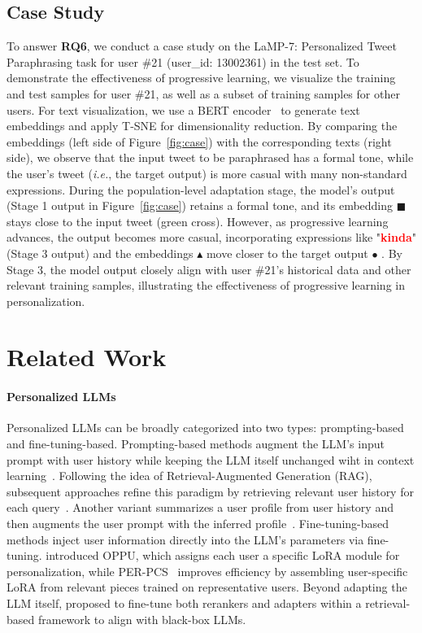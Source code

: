 \documentclass[11pt]{article}
\begin{document}
\subsection{Case Study}

To answer \textbf{RQ6}, we conduct a case study on the LaMP-7: Personalized Tweet Paraphrasing task for user \#21 (user\_id: 13002361) in the test set. 
To demonstrate the effectiveness of progressive learning, we visualize the training and test samples for user \#21, as well as a subset of training samples for other users. 
For text visualization, we use a BERT encoder~\cite{reimers-gurevych-2019-sentence} to generate text embeddings and apply T-SNE for dimensionality reduction.
By comparing the embeddings (left side of Figure~\ref{fig:case}) with the corresponding texts (right side), we observe that the input tweet to be paraphrased has a formal tone, while the user’s tweet (\textit{i.e.}, the target output) is more casual with many non-standard expressions. 
During the population-level adaptation stage, the model's output (Stage 1 output in Figure~\ref{fig:case}) retains a formal tone, and its embedding \textcolor{green!70}{$\blacksquare$} stays close to the input tweet (green cross). 
However, as progressive learning advances, the output becomes more casual, incorporating expressions like "\textcolor{red}{\textbf{kinda}}" (Stage 3 output) and the embeddings \textcolor{green!70}{$\blacktriangle$} move closer to the target output \textcolor{green!70}{$\bullet$} . 
By Stage 3, the model output closely align with user \#21's historical data 
 and other relevant training samples, illustrating the effectiveness of progressive learning in personalization.

 
\section{Related Work}

\paragraph{Personalized LLMs}
Personalized LLMs can be broadly categorized into two types: prompting-based and fine-tuning-based.
Prompting-based methods augment the LLM’s input prompt with user history while keeping the LLM itself unchanged wiht in context learning~\cite{dai2023uncovering,kang2023llms}. 
Following the idea of Retrieval-Augmented Generation (RAG), subsequent approaches refine this paradigm by retrieving relevant user history for each query~\cite{salemi-etal-2024-lamp,mysore-etal-2024-pearl}. 
Another variant summarizes a user profile from user history and then augments the user prompt with the inferred profile~\cite{richardson2023integrating}.
Fine-tuning-based methods inject user information directly into the LLM’s parameters via fine-tuning. 
\citet{tan-etal-2024-democratizing} introduced OPPU, which assigns each user a specific LoRA module for personalization, while PER-PCS~\cite{tan-etal-2024-personalized} improves efficiency by assembling user-specific LoRA from relevant pieces trained on representative users.
Beyond adapting the LLM itself, \citet{zhuang2024hydra} proposed to fine-tune both rerankers and adapters within a retrieval-based framework to align with black-box LLMs. 
\end{document}
